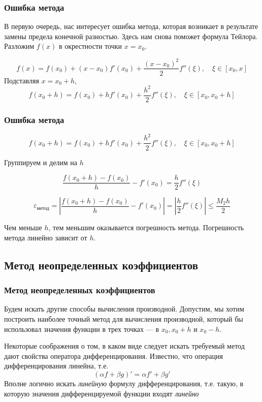 \documentclass[aspectratio=169,unicode]{beamer}
\begin{document}
\begin{frame}
\frametitle{Ошибка метода}
	В первую очередь, нас интересует ошибка метода, которая возникает в результате замены предела
	конечной разностью. Здесь нам снова поможет формула Тейлора. Разложим $f(x)$ в окрестности
	точки $x = x_0$.

	\[
	f(x) = f(x_0) + (x-x_0) f'(x_0) + \frac{(x-x_0)^2}{2} f''(\xi), \quad \xi \in [x_0,x]
	\]
	\pause
	Подставляя $x = x_0 + h$,
	\[
	f(x_0 + h) = f(x_0) + h f'(x_0) + \frac{h^2}{2} f''(\xi), \quad \xi \in [x_0,x_0+h]
	\]
\end{frame}

\begin{frame}
\frametitle{Ошибка метода}
	\[
	f(x_0 + h) = f(x_0) + h f'(x_0) + \frac{h^2}{2} f''(\xi), \quad \xi \in [x_0,x_0+h]
	\]

	Группируем и делим на $h$

	\[
	\frac{f(x_0 + h) - f(x_0)}{h} - f'(x_0) = \frac{h}{2} f''(\xi)
	\]

	\[
	\varepsilon_{\text{метод}} = \left|\frac{f(x_0 + h) - f(x_0)}{h} - f'(x_0) \right| = \left |\frac{h}{2} f''(\xi) \right | \leqslant \frac{M_2 h}{2}
	\]

	Чем меньше $h$, тем меньшим оказывается погрешность метода. Погрешность метода линейно зависит от $h$.
\end{frame}

\subsection{Метод неопределенных коэффициентов}
\begin{frame}
\frametitle{Метод неопределенных коэффициентов}
	Будем искать другие способы вычисления производной. Допустим, мы хотим построить наиболее
	точный метод для вычисления производной, который бы использовал значения функции в трех точках ---
	в $x_0, x_0+h$ и $x_0-h$.

	Некоторые соображения о том, в каком виде следует искать требуемый метод дают свойства оператора дифференцирования.
	Известно, что операция дифференцирования линейна, т.е.
	\[
	(\alpha f + \beta g)' = \alpha f' + \beta g'
	\]
	Вполне логично искать \emph{линейную} формулу дифференцирования, т.е. такую, в которую значения дифференцируемой функции входят
	\emph{линейно}
\end{frame}
\end{document}
